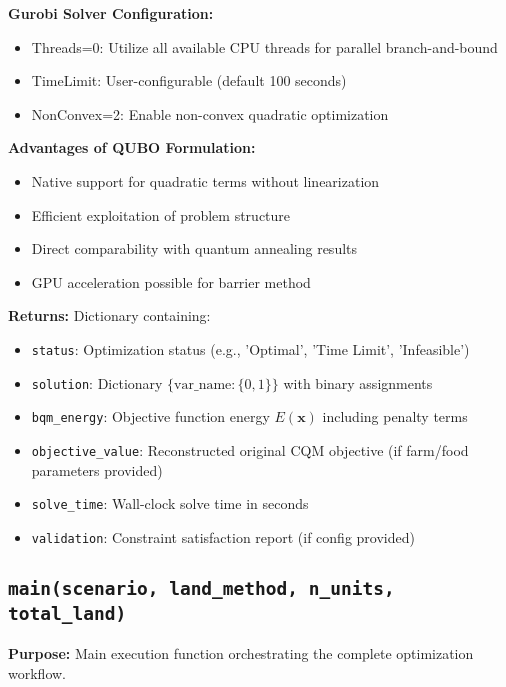 \documentclass{article}
\begin{document}
\textbf{Gurobi Solver Configuration:}
\begin{itemize}
    \item Threads=0: Utilize all available CPU threads for parallel branch-and-bound
    \item TimeLimit: User-configurable (default 100 seconds)
    \item NonConvex=2: Enable non-convex quadratic optimization
\end{itemize}

\textbf{Advantages of QUBO Formulation:}
\begin{itemize}
    \item Native support for quadratic terms without linearization
    \item Efficient exploitation of problem structure
    \item Direct comparability with quantum annealing results
    \item GPU acceleration possible for barrier method
\end{itemize}

\textbf{Returns:} Dictionary containing:
\begin{itemize}
    \item \texttt{status}: Optimization status (e.g., 'Optimal', 'Time Limit', 'Infeasible')
    \item \texttt{solution}: Dictionary $\{\text{var\_name}: \{0,1\}\}$ with binary assignments
    \item \texttt{bqm\_energy}: Objective function energy $E(\mathbf{x})$ including penalty terms
    \item \texttt{objective\_value}: Reconstructed original CQM objective (if farm/food parameters provided)
    \item \texttt{solve\_time}: Wall-clock solve time in seconds
    \item \texttt{validation}: Constraint satisfaction report (if config provided)
\end{itemize}

\subsection{\texttt{main(scenario, land\_method, n\_units, total\_land)}}

\textbf{Purpose:} Main execution function orchestrating the complete optimization workflow.
\end{document}
